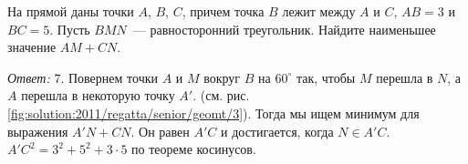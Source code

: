На прямой даны точки $A$, $B$, $C$, причем точка $B$ лежит между $A$ и $C$, $AB = 3$ и $BC = 5$.
Пусть $BMN$~--- равносторонний треугольник.
Найдите наименьшее значение $AM + CN$.


%
\label{solution:2011/regatta/senior/geomt/3}%
\emph{Ответ:} $7$.
Повернем точки $A$ и $M$ вокруг $B$ на $60^\circ$ так, чтобы $M$ перешла в $N$,
а $A$ перешла в некоторую точку $A'$.
(см. рис. \ref{fig:solution:2011/regatta/senior/geomt/3}).
Тогда мы ищем минимум для выражения $A'N + CN$.
Он равен $A'C$ и достигается, когда $N \in A'C$.
$A'C^2 = 3^2 + 5^2 + 3 \cdot 5$ по теореме косинусов.


